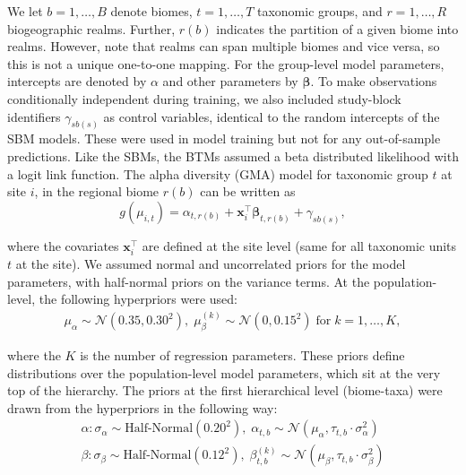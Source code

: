 We let $b = 1, \dots, B$ denote biomes, $t = 1, \dots, T$ taxonomic groups, and $r = 1, \dots, R$ biogeographic realms. Further, $r(b)$ indicates the partition of a given biome into realms. However, note that realms can span multiple biomes and vice versa, so this is not a unique one-to-one mapping. For the group-level model parameters, intercepts are denoted by $\alpha$ and other parameters by $\boldsymbol{\beta}$. To make observations conditionally independent during training, we also included study-block identifiers $\gamma_{sb(s)}$ as control variables, identical to the random intercepts of the SBM models. These were used in model training but not for any out-of-sample predictions. Like the SBMs, the BTMs assumed a beta distributed likelihood with a logit link function. The alpha diversity (GMA) model for taxonomic group $t$ at site $i$, in the regional biome $r(b)$ can be written as
\vspace{0.25\baselineskip}
\begin{equation*}
    g(\mu_{i,t}) = \alpha_{t,r(b)} + \mathbf{x}_i^\top \boldsymbol{\beta}_{t,r(b)} + \gamma_{sb(s)},
\end{equation*}

where the covariates $\mathbf{x}_i^\top$ are defined at the site level (same for all taxonomic units $t$ at the site). We assumed normal and uncorrelated priors for the model parameters, with half-normal priors on the variance terms. At the population-level, the following hyperpriors were used:
\vspace{0.25\baselineskip}
\begin{equation*}
\begin{aligned}
    \mu_{\alpha} \sim \mathcal{N}(0.35, 0.30^2), \; \mu_{\beta}^{(k)} \sim \mathcal{N}(0, 0.15^2)  \; \text{for} \; k = 1, \dots, K,
\end{aligned}
\end{equation*}

where the $K$ is the number of regression parameters. These priors define distributions over the population-level model parameters, which sit at the very top of the hierarchy. The priors at the first hierarchical level (biome-taxa) were drawn from the hyperpriors in the following way:
\vspace{0.25\baselineskip}
\begin{equation*}
\begin{gathered}
    \alpha: \sigma_{\alpha} \sim \text{Half-Normal}(0.20^2), \; \alpha_{t,b} \sim \mathcal{N}(\mu_{\alpha}, \tau_{t,b} \cdot \sigma_{\alpha}^2) \\
    \beta: \sigma_{\beta} \sim \text{Half-Normal}(0.12^2), \; \beta_{t,b}^{(k)} \sim \mathcal{N}(\mu_{\beta}, \tau_{t,b} \cdot \sigma_{\beta}^2)
\end{gathered}
\end{equation*}


